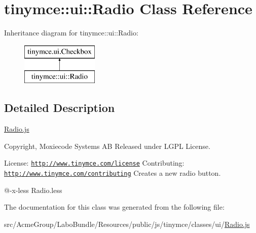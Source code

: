 \hypertarget{classtinymce_1_1ui_1_1_radio}{\section{tinymce\+:\+:ui\+:\+:Radio Class Reference}
\label{classtinymce_1_1ui_1_1_radio}
}
Inheritance diagram for tinymce\+:\+:ui\+:\+:Radio\+:\begin{figure}[H]
\begin{center}
\leavevmode
\includegraphics[height=2.000000cm]{classtinymce_1_1ui_1_1_radio}
\end{center}
\end{figure}


\subsection{Detailed Description}
\hyperlink{_radio_8js}{Radio.\+js}

Copyright, Moxiecode Systems A\+B Released under L\+G\+P\+L License.

License\+: \href{http://www.tinymce.com/license}{\tt http\+://www.\+tinymce.\+com/license} Contributing\+: \href{http://www.tinymce.com/contributing}{\tt http\+://www.\+tinymce.\+com/contributing} Creates a new radio button.

@-\/x-\/less Radio.\+less 

The documentation for this class was generated from the following file\+:\begin{DoxyCompactItemize}
\item 
src/\+Acme\+Group/\+Labo\+Bundle/\+Resources/public/js/tinymce/classes/ui/\hyperlink{_radio_8js}{Radio.\+js}\end{DoxyCompactItemize}
